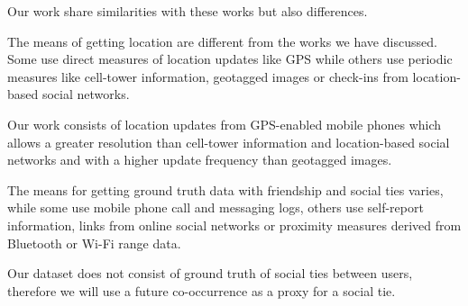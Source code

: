 Our work share similarities with these works but also differences.

The means of getting location are different from the works we have discussed. Some use direct measures of location updates like GPS\cite{cranshaw2010bridging} while others use periodic measures like cell-tower information\cite{eagle}, geotagged images\cite{crandall2010inferring} or check-ins from location-based social networks\cite{FaMUMiLBSN}.

Our work consists of location updates from GPS-enabled mobile phones which allows a greater resolution than cell-tower information and location-based social networks and with a higher update frequency than geotagged images.

The means for getting ground truth data with friendship and social ties varies, while some use mobile phone call and messaging logs, others use self-report information\cite{eagle}, links from online social networks\cite{cranshaw2010bridging}\cite{crandall2010inferring} or proximity measures derived from Bluetooth\cite{eagle} or Wi-Fi range data\cite{IPISTWS}.

Our dataset does not consist of ground truth of social ties between users, therefore we will use a future co-occurrence as a proxy for a social tie.